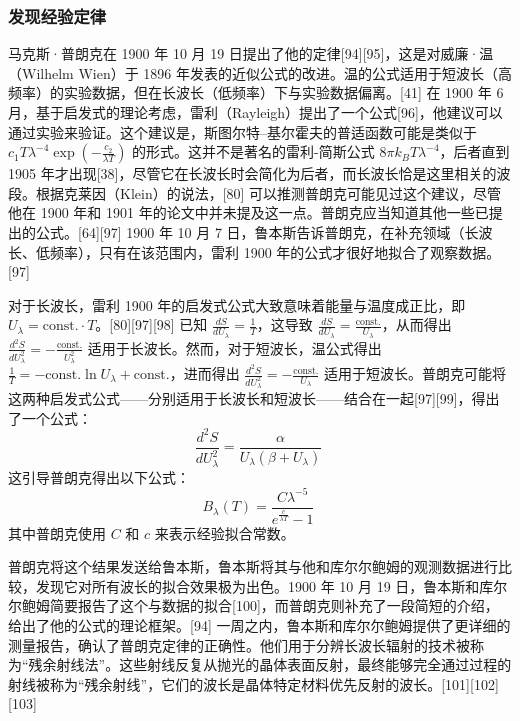 \subsubsection{发现经验定律}
马克斯·普朗克在 1900 年 10 月 19 日提出了他的定律[94][95]，这是对威廉·温（Wilhelm Wien）于 1896 年发表的近似公式的改进。温的公式适用于短波长（高频率）的实验数据，但在长波长（低频率）下与实验数据偏离。[41] 在 1900 年 6 月，基于启发式的理论考虑，雷利（Rayleigh）提出了一个公式[96]，他建议可以通过实验来验证。这个建议是，斯图尔特–基尔霍夫的普适函数可能是类似于 \( c_1 T \lambda^{-4} \exp \left( -\frac{c_2}{\lambda T} \right) \) 的形式。这并不是著名的雷利-简斯公式 \( 8\pi k_B T \lambda^{-4} \)，后者直到 1905 年才出现[38]，尽管它在长波长时会简化为后者，而长波长恰是这里相关的波段。根据克莱因（Klein）的说法，[80] 可以推测普朗克可能见过这个建议，尽管他在 1900 年和 1901 年的论文中并未提及这一点。普朗克应当知道其他一些已提出的公式。[64][97] 1900 年 10 月 7 日，鲁本斯告诉普朗克，在补充领域（长波长、低频率），只有在该范围内，雷利 1900 年的公式才很好地拟合了观察数据。[97]

对于长波长，雷利 1900 年的启发式公式大致意味着能量与温度成正比，即 \( U_{\lambda} = \text{const.} \cdot T \)。[80][97][98] 已知 \( \frac{dS}{dU_{\lambda}} = \frac{1}{T} \)，这导致 \( \frac{dS}{dU_{\lambda}} = \frac{\text{const.}}{U_{\lambda}} \)，从而得出 \( \frac{d^2S}{dU_{\lambda}^2} = - \frac{\text{const.}}{U_{\lambda}^2} \) 适用于长波长。然而，对于短波长，温公式得出 \( \frac{1}{T} = - \text{const.} \ln U_{\lambda} + \text{const.} \)，进而得出 \( \frac{d^2S}{dU_{\lambda}^2} = - \frac{\text{const.}}{U_{\lambda}} \) 适用于短波长。普朗克可能将这两种启发式公式——分别适用于长波长和短波长——结合在一起[97][99]，得出了一个公式：
\[
\frac{d^2S}{dU_{\lambda}^2} = \frac{\alpha}{U_{\lambda} (\beta + U_{\lambda})}~
\]
这引导普朗克得出以下公式：
\[
B_{\lambda}(T) = \frac{C \lambda^{-5}}{e^{\frac{c}{\lambda T}} - 1}~
\]
其中普朗克使用 \( C \) 和 \( c \) 来表示经验拟合常数。

普朗克将这个结果发送给鲁本斯，鲁本斯将其与他和库尔尔鲍姆的观测数据进行比较，发现它对所有波长的拟合效果极为出色。1900 年 10 月 19 日，鲁本斯和库尔尔鲍姆简要报告了这个与数据的拟合[100]，而普朗克则补充了一段简短的介绍，给出了他的公式的理论框架。[94] 一周之内，鲁本斯和库尔尔鲍姆提供了更详细的测量报告，确认了普朗克定律的正确性。他们用于分辨长波长辐射的技术被称为“残余射线法”。这些射线反复从抛光的晶体表面反射，最终能够完全通过过程的射线被称为“残余射线”，它们的波长是晶体特定材料优先反射的波长。[101][102][103]
